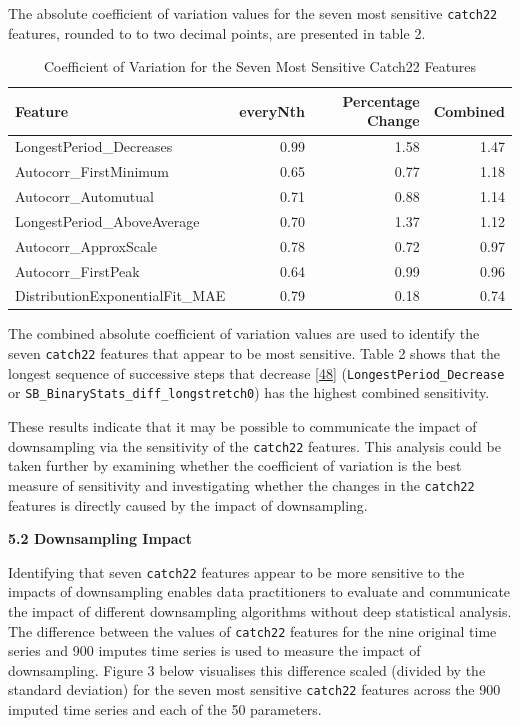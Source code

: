 \documentclass{article}
\begin{document}
The absolute coefficient of variation values for the seven most
sensitive \texttt{catch22} features, rounded to to two decimal points,
are presented in table 2.

\vspace{-0.2cm}

\begin{table}[H]

\caption{\label{tab:unnamed-chunk-2}Coefficient of Variation for the Seven Most Sensitive Catch22 Features}
\centering
\begin{tabular}[t]{l|r|r|r}
\hline
Feature & everyNth & Percentage Change & Combined\\
\hline
LongestPeriod\_Decreases & 0.99 & 1.58 & 1.47\\
\hline
Autocorr\_FirstMinimum & 0.65 & 0.77 & 1.18\\
\hline
Autocorr\_Automutual & 0.71 & 0.88 & 1.14\\
\hline
LongestPeriod\_AboveAverage & 0.70 & 1.37 & 1.12\\
\hline
Autocorr\_ApproxScale & 0.78 & 0.72 & 0.97\\
\hline
Autocorr\_FirstPeak & 0.64 & 0.99 & 0.96\\
\hline
DistributionExponentialFit\_MAE & 0.79 & 0.18 & 0.74\\
\hline
\end{tabular}
\end{table}

The combined absolute coefficient of variation values are used to
identify the seven \texttt{catch22} features that appear to be most
sensitive. Table 2 shows that the longest sequence of successive steps
that decrease \protect\hyperlink{ref-feature_book}{{[}48{]}}
(\texttt{LongestPeriod\_Decrease} or
\texttt{SB\_BinaryStats\_diff\_longstretch0}) has the highest combined
sensitivity.

These results indicate that it may be possible to communicate the impact
of downsampling via the sensitivity of the \texttt{catch22} features.
This analysis could be taken further by examining whether the
coefficient of variation is the best measure of sensitivity and
investigating whether the changes in the \texttt{catch22} features is
directly caused by the impact of downsampling.

\textbf{5.2 Downsampling Impact}

Identifying that seven \texttt{catch22} features appear to be more
sensitive to the impacts of downsampling enables data practitioners to
evaluate and communicate the impact of different downsampling algorithms
without deep statistical analysis. The difference between the values of
\texttt{catch22} features for the nine original time series and 900
imputes time series is used to measure the impact of downsampling.
Figure 3 below visualises this difference scaled (divided by the
standard deviation) for the seven most sensitive \texttt{catch22}
features across the 900 imputed time series and each of the 50
parameters.
\end{document}
